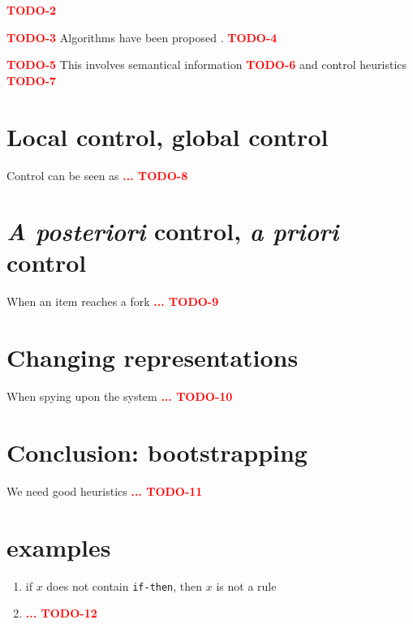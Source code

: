 \documentclass[11pt,a4paper,svgnames]{article}
\begin{document}
  {\textcolor{red}{\textbf{TODO-2}}}

  {\textcolor{red}{\textbf{TODO-3}}}
  Algorithms have been proposed \cite{Forgy-Rete-1982}.
  {\textcolor{red}{\textbf{TODO-4}}}


  {\textcolor{red}{\textbf{TODO-5}}}
  This involves semantical information
  {\textcolor{red}{\textbf{TODO-6}}}
  and control heuristics \cite{Lenat-Heuristics-1982,Lenat-Eurisko-1983}
  {\textcolor{red}{\textbf{TODO-7}}}

  \section{Local control, global control}
  \label{sec:loc-glob-control}

  Control can be seen as
  {\textcolor{red}{\textbf{... TODO-8}}}


  \section{\textit{A posteriori} control, \textit{a priori} control}
  \label{sec:posteriori-priori-control}
When an item reaches a fork
  {\textcolor{red}{\textbf{... TODO-9}}}

  \section{Changing representations}
  \label{sec:changing-repr}
  When spying upon the system
  {\textcolor{red}{\textbf{... TODO-10}}}

  \section{Conclusion: bootstrapping}
  \label{sec:concl-bootstrap}
  We need good heuristics
  {\textcolor{red}{\textbf{... TODO-11}}}

  \section*{examples}
  \label{sec:examples}

  \begin{enumerate}
  \item if $x$ does not contain \texttt{if-then}, then $x$ is not a rule
    \item
      {\textcolor{red}{\textbf{... TODO-12}}}

  \end{enumerate}

\clearpage
{}



\end{document}
